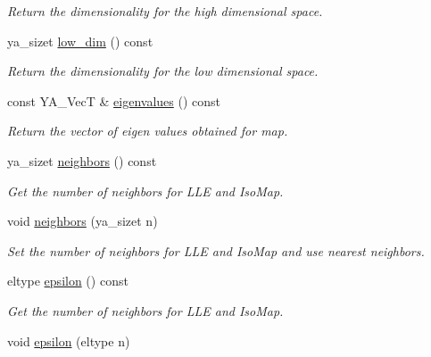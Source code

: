 \begin{CompactItemize}
\begin{CompactList}\small\item\em Return the dimensionality for the high dimensional space. \item\end{CompactList}\item 
\hypertarget{class_y_a_dim_reduce_a19}{
ya\_\-sizet \hyperlink{class_y_a_dim_reduce_a19}{low\_\-dim} () const }
\label{class_y_a_dim_reduce_a19}

\begin{CompactList}\small\item\em Return the dimensionality for the low dimensional space. \item\end{CompactList}\item 
\hypertarget{class_y_a_dim_reduce_a20}{
const YA\_\-Vec\-T \& \hyperlink{class_y_a_dim_reduce_a20}{eigenvalues} () const }
\label{class_y_a_dim_reduce_a20}

\begin{CompactList}\small\item\em Return the vector of eigen values obtained for map. \item\end{CompactList}\item 
\hypertarget{class_y_a_dim_reduce_a21}{
ya\_\-sizet \hyperlink{class_y_a_dim_reduce_a21}{neighbors} () const }
\label{class_y_a_dim_reduce_a21}

\begin{CompactList}\small\item\em Get the number of neighbors for LLE and Iso\-Map. \item\end{CompactList}\item 
\hypertarget{class_y_a_dim_reduce_a22}{
void \hyperlink{class_y_a_dim_reduce_a22}{neighbors} (ya\_\-sizet n)}
\label{class_y_a_dim_reduce_a22}

\begin{CompactList}\small\item\em Set the number of neighbors for LLE and Iso\-Map and use nearest neighbors. \item\end{CompactList}\item 
\hypertarget{class_y_a_dim_reduce_a23}{
eltype \hyperlink{class_y_a_dim_reduce_a23}{epsilon} () const }
\label{class_y_a_dim_reduce_a23}

\begin{CompactList}\small\item\em Get the number of neighbors for LLE and Iso\-Map. \item\end{CompactList}\item 
\hypertarget{class_y_a_dim_reduce_a24}{
void \hyperlink{class_y_a_dim_reduce_a24}{epsilon} (eltype n)}
\label{class_y_a_dim_reduce_a24}


\end{CompactItemize}
